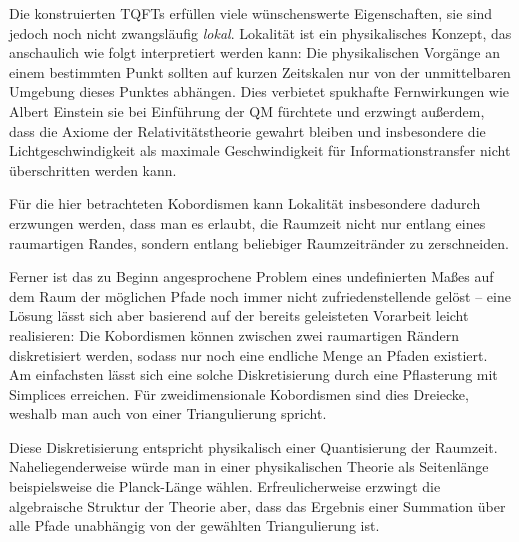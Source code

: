 Die konstruierten TQFTs erfüllen viele wünschenswerte Eigenschaften,
sie sind jedoch noch nicht zwangsläufig \textit{lokal}. Lokalität ist ein
physikalisches Konzept, das anschaulich wie folgt interpretiert werden
kann: Die physikalischen Vorgänge an einem bestimmten Punkt sollten
auf kurzen Zeitskalen nur von der unmittelbaren Umgebung dieses
Punktes abhängen. Dies verbietet spukhafte Fernwirkungen wie Albert
Einstein sie bei Einführung der QM fürchtete und erzwingt außerdem,
dass die Axiome der Relativitätstheorie gewahrt bleiben und
insbesondere die Lichtgeschwindigkeit als maximale Geschwindigkeit für
Informationstransfer nicht überschritten werden kann.

Für die hier betrachteten Kobordismen kann Lokalität insbesondere
dadurch erzwungen werden, dass man es erlaubt, die Raumzeit nicht nur
entlang eines raumartigen Randes, sondern entlang beliebiger
Raumzeitränder zu zerschneiden.

Ferner ist das zu Beginn angesprochene Problem eines undefinierten
Maßes auf dem Raum der möglichen Pfade noch immer nicht
zufriedenstellende gelöst -- eine Lösung lässt sich aber basierend auf
der bereits geleisteten Vorarbeit leicht realisieren: Die Kobordismen
können zwischen zwei raumartigen Rändern diskretisiert werden, sodass
nur noch eine endliche Menge an Pfaden existiert. Am einfachsten lässt
sich eine solche Diskretisierung durch eine Pflasterung mit
Simplices erreichen. Für zweidimensionale Kobordismen sind dies
Dreiecke, weshalb man auch von einer Triangulierung spricht.

Diese Diskretisierung entspricht physikalisch einer Quantisierung der
Raumzeit. Naheliegenderweise würde man in einer physikalischen Theorie
als Seitenlänge beispielsweise die Planck-Länge
wählen. Erfreulicherweise erzwingt die algebraische Struktur der
Theorie aber, dass das Ergebnis einer Summation über alle Pfade
unabhängig von der gewählten Triangulierung ist.

